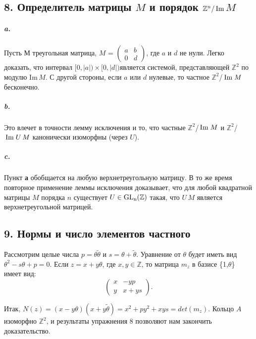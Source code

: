 {\subsection{\normalsize{8. Определитель матрицы $M$ и порядок $\mathbb {Z}^{n}/\,{\rm Im}\,${$M$}}}

\subparagraph{a.} Пусть $М$ треугольная матрица, $M$ = $\begin{pmatrix} a & b \\ 0 & d \end{pmatrix}$, где $a$ и $d$ не нули. Легко доказать, что интервал $[0,|a|)\times[0,|d|)$является системой, представляющей $\mathbb {Z}^2$ по модулю Im$\,${$M$}. С другой стороны, если $a$ или $d$ нулевые, то частное $\mathbb {Z}^2$/$\,{\rm Im}\;{M}$ бесконечно.

\subparagraph{b.} Это влечет в точности лемму исключения и то, что частные $\mathbb {Z}^2$/$\,{\rm Im}\;{M}$ и $\mathbb {Z}^2$/$\,{\rm Im}\;{U\,M}$ канонически изоморфны (через $U$).

\subparagraph{c.} Пункт {\bf а} обобщается на любую верхнетреугольную матрицу. В то же время повторное применение леммы исключения доказывает, что для любой квадратной матрицы $M$ порядка $n$ существует $U \in \rm{GL_{n}}(\mathbb {Z})$ такая, что $U\,M$ является верхнетреугольной матрицей.

\subsection{\normalsize{9. Нормы и число элементов частного}} 

Рассмотрим целые числа $p = \theta\tilde{\theta}$ и $s = \theta + \tilde{\theta}$. Уравнение от $\theta$ будет иметь вид $\theta^{2} - s\theta + p = 0$. Если $z = x + y\theta$, где $x,y \in \mathbb {Z}$, то матрица $m_{z}$ в базисе \{1,$\theta$\} имеет вид:
\begin{equation*}
\begin{pmatrix} x & -yp \\ y & x + ys \end{pmatrix}.
\end{equation*}

\noindent Итак, $N(z) = (x - y{\theta})(x + y\tilde{\theta}) = x^2 + py^2 + xys = det(m_{z})$. Кольцо $A$ изоморфно $\mathbb {Z}^2$, и результаты упражнения 8 позволяют нам закончить доказательство.

\newpage


}
